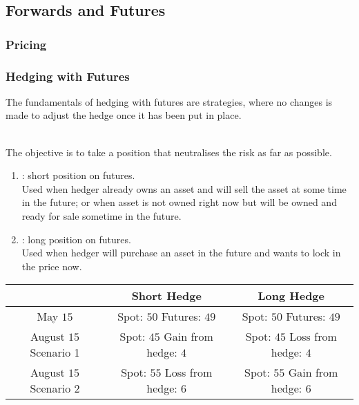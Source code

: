 \subsection{Forwards and Futures}

\subsubsection{Pricing}



\subsubsection{Hedging with Futures}

The fundamentals of hedging with futures are  strategies, where no changes is made to adjust the hedge once it has been put in place.

\begin{definition}
\\
The objective is to take a position that neutralises the risk as far as possible.
\begin{enumerate}[label=\roman*.]
\setlength{\itemsep}{0pt}
\item {}: short position on futures. \\
Used when hedger already owns an asset and will sell the asset at some time in the future; or when asset is not owned right now but will be owned and ready for sale sometime in the future.
\item {}: long position on futures. \\
Used when hedger will purchase an asset in the future and wants to lock in the price now.
\end{enumerate}
\begin{table}[h]
\begin{tabular}{|c | c | c|}
\hline
 & \textbf{Short Hedge} & \textbf{Long Hedge} \\ \hline
May $15$ & \makecell[l]{Spot: $50$ \\ Futures: $49$} & \makecell[l]{Spot: $50$ \\ Futures: $49$} \\ \hline
August $15$ Scenario 1 & \makecell[l]{Spot: $45$ \\ Gain from hedge: $4$} &  \makecell[l]{Spot: $45$ \\ Loss from hedge: $4$} \\ \hline
August $15$ Scenario 2 & \makecell[l]{Spot: $55$ \\ Loss from hedge: $6$} & \makecell[l]{Spot: $55$ \\ Gain from hedge: $6$} \\ \hline
\end{tabular}
\end{table}
\end{definition}

